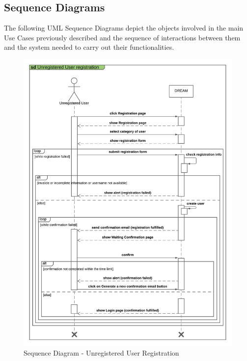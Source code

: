 \subsection{Sequence Diagrams}

The following UML Sequence Diagrams depict the objects involved in the main Use Cases previously described and the sequence of interactions between them and the system needed to carry out their functionalities.\\

\begin{center}
    \begin{figure}[H]
  \includegraphics[width=\textwidth,height=\textheight,keepaspectratio]{./Images/Sequence Diagram User Registration.png}
  \caption{Sequence Diagram - Unregistered User Registration}
\end{figure}
\end{center}

